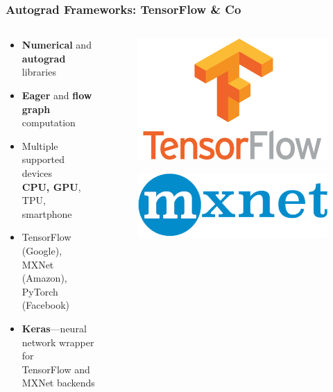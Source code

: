 \documentclass[aspectratio=169]{beamer}
\newcommand\imageright[1]{ %
    \caption*{\scalebox{.5}{\textcolor{lightgray}{\textcopyright~#1}}} %
}
\begin{document}
\begin{frame}
\frametitle{Autograd Frameworks: TensorFlow \& Co}

\begin{columns}
    \begin{column}{0.48\textwidth}
        \begin{itemize}
            \item \textbf{Numerical} and \textbf{autograd} libraries
            \item \textbf{Eager} and \textbf{flow graph} computation
            \item Multiple supported devices\\
            \textbf{CPU, GPU}, TPU, smartphone
            \item TensorFlow (Google), MXNet (Amazon), PyTorch (Facebook)
            \item \textbf{Keras}---neural network wrapper for\\
            TensorFlow and MXNet backends
        \end{itemize}
    \end{column}
    \begin{column}{0.23\textwidth}
        \begin{figure}
            \centering
            \includegraphics[height=0.6\linewidth]{tensorflow.png}
            \imageright{Google}
        \end{figure}
        \vfill
        \begin{figure}
            \centering
            \includegraphics[width=0.9\linewidth]{mxnet.png}

\end{figure}
\end{column}
\end{columns}
\end{frame}
\end{document}

